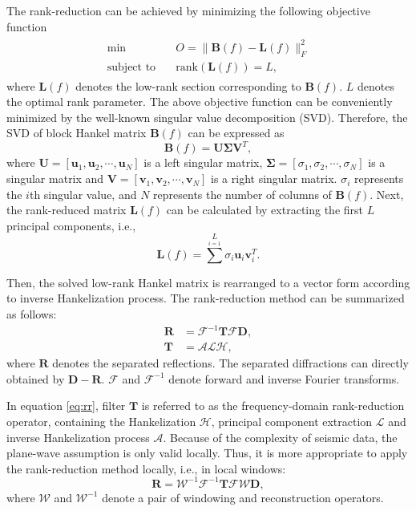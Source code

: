 The rank-reduction can be achieved by minimizing the following objective function
\begin{align} \label{eq:obj} 
\begin{split}
\text{min} \quad &O=\|\mathbf{B}(f)-\mathbf{L}(f)\|^2_F\\
\text{subject to} \quad&\text{rank}(\mathbf{L}(f))=L,
\end{split}
\end{align} 
where $\mathbf{L}(f)$ denotes the low-rank section corresponding to $\mathbf{B}(f)$. $L$ denotes the optimal rank parameter. The above objective function can be conveniently minimized by the well-known singular value decomposition (SVD). Therefore, the SVD of block Hankel matrix $\mathbf{B}(f)$ can be expressed as
\begin{equation} \label{eq:svd}
\mathbf{B}(f)=\mathbf{U}\mathbf{\Sigma}\mathbf{V}^T,
\end{equation}
where $\mathbf{U}=[\mathbf{u}_1,\mathbf{u}_2,\cdots,\mathbf{u}_N]$ is a left singular matrix, $\mathbf{\Sigma}=[{\sigma}_1,{\sigma}_2,\cdots,{\sigma}_N]$ is a singular matrix and $\mathbf{V}=[\mathbf{v}_1,\mathbf{v}_2,\cdots,\mathbf{v}_N]$ is a right singular matrix. $\sigma_i$ represents the $i$th singular value, and $N$ represents the number of columns of $\mathbf{B}(f)$. Next, the rank-reduced matrix $\mathbf{L}(f)$ can be calculated by extracting the first $L$ principal components, i.e.,
\begin{equation}\label{eq:solution}
\mathbf{L}(f)=\sum^L \limits_{i=1} {\sigma}_i\mathbf{u}_i\mathbf{v}_i^T.
\end{equation}

Then, the solved low-rank Hankel matrix is rearranged to a vector form according to inverse Hankelization process. The rank-reduction method can be summarized as follows:
\begin{equation}
\label{eq:rr}
\begin{split}
\mathbf{R} &=\mathcal{F}^{-1}\mathbf{T}\mathcal{F}\mathbf{D},\\
\mathbf{T} &=\mathcal{A}\mathcal{L}\mathcal{H},
\end{split}
\end{equation}
where $\mathbf{R}$ denotes the separated reflections. The separated diffractions can directly obtained by $\mathbf{D}-\mathbf{R}$. $\mathcal{F}$ and $\mathcal{F}^{-1}$ denote forward and inverse Fourier transforms. 

In equation \ref{eq:rr}, filter $\mathbf{T}$ is referred to as the frequency-domain rank-reduction operator, containing the Hankelization $\mathcal{H}$, principal component extraction $\mathcal{L}$ and inverse Hankelization process $\mathcal{A}$.   Because of the complexity of seismic data, the plane-wave assumption is only valid locally. Thus, it is more appropriate to apply the rank-reduction method locally, i.e., in local windows:
\begin{equation}
\label{eq:lrr}
\mathbf{R} =\mathcal{W}^{-1}\mathcal{F}^{-1}\mathbf{T}\mathcal{F}\mathcal{W}\mathbf{D},
\end{equation}
where $\mathcal{W}$ and $\mathcal{W}^{-1}$ denote a pair of windowing and reconstruction operators. 

